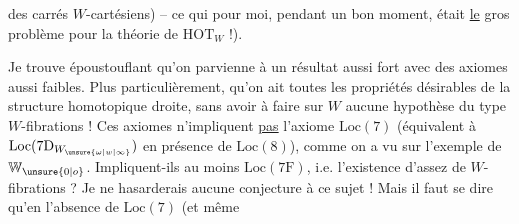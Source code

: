 des carrés $W$-cartésiens) -- ce qui pour moi, pendant un bon moment, était \uline{le} gros problème pour la théorie de $\mathrm{HOT}_W$ !).

Je trouve époustouflant qu'on parvienne à un résultat aussi fort avec des axiomes aussi  faibles. Plus particulièrement, qu'on ait toutes les propriétés  désirables de la structure homotopique droite, sans avoir à faire sur $W$ aucune hypothèse du type $W$-fibrations !
Ces axiomes n'impliquent \uline{pas} l'axiome $\mathrm{Loc}(7)$ (équivalent à $\mathrm{Loc}(7\mathrm{D}_{W_{\unsure{\omega|w|\infty}}})$ en présence de $\mathrm{Loc}(8)$), comme on a vu sur l'exemple de $\mathbb{W}_{\unsure{0|o}}$. Impliquent-ils  au moins $\mathrm{Loc}(7\mathrm{F})$, i.e. l'existence d'assez de $W$-fibrations ? Je ne hasarderais aucune conjecture à ce sujet ! Mais il faut  se dire qu'en l'absence de $\mathrm{Loc}(7)$ (et même

